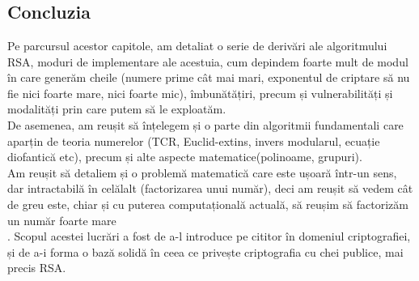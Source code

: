 \documentclass[12pt, oneside]{book}
\begin{document}
\chapter*{}
\section*{Concluzia}
Pe parcursul acestor capitole, am detaliat o serie de derivări ale algoritmului RSA, moduri de implementare ale acestuia, cum depindem foarte mult de modul în care generăm cheile (numere prime cât mai mari, exponentul de criptare să nu fie nici foarte mare, nici foarte mic), îmbunătățiri, precum și vulnerabilități și modalități prin care putem să le exploatăm. \\
De asemenea, am reușit să înțelegem și o parte din algoritmii fundamentali care aparțin de teoria numerelor (TCR, Euclid-extins, invers modularul, ecuație diofantică etc), precum și alte aspecte matematice(polinoame, grupuri). \\
Am reușit să detaliem și o problemă  matematică care este ușoară într-un sens, dar intractabilă în celălalt (factorizarea unui număr), deci am reușit să vedem cât de greu este, chiar și cu puterea computațională actuală, să reușim să factorizăm un număr foarte mare\\. 
Scopul acestei lucrări a fost de a-l introduce pe cititor în domeniul criptografiei, și de a-i forma o bază solidă în ceea ce privește criptografia cu chei publice, mai precis RSA.


\medskip
\end{document}
